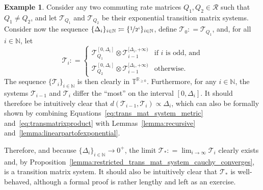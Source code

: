 \documentclass[10pt,a4paper]{paper}
\theoremstyle{definition}
\newtheorem{exmp}{Example}%
\newcommand{\nats}{\mathbb{N}}
\newcommand{\reals}{\mathbb{R}}
\newcommand{\realsnonneg}{\reals_{\geq 0}}
\newcommand{\coloneqq}{:\!=}
\begin{document}
\begin{exmp}\label{exmp:limit_trans_mat_system}
Consider any two commuting rate matrices $Q_1,Q_2\in\mathcal{R}$ such that $Q_1\neq Q_2$, and let $\mathcal{T}_{Q_1}$ and $\mathcal{T}_{Q_2}$ be their exponential transition matrix systems. Consider now the sequence $\{\Delta_i\}_{i\in\nats}\coloneqq \{\nicefrac{1}{2^i}\}_{i\in\nats}$, define $\mathcal{T}_0\coloneqq \mathcal{T}_{Q_1}$, and, for all $i\in\nats$, let
\begin{equation*}
\mathcal{T}_i \coloneqq \begin{cases}
\mathcal{T}_{Q_1}^{[0,\Delta_i]}\otimes \mathcal{T}_{i-1}^{[\Delta_i,+\infty)} & \text{if $i$ is odd, and} \\
\mathcal{T}_{Q_2}^{[0,\Delta_i]}\otimes \mathcal{T}_{i-1}^{[\Delta_i,+\infty)} & \text{otherwise.}
\end{cases}
\end{equation*}
The sequence $\{\mathcal{T}_i\}_{i\in\nats}$ is then clearly in $\mathbb{T}^{\realsnonneg}$. Furthermore, for any $i\in\nats$, the systems $\mathcal{T}_{i-1}$ and $\mathcal{T}_i$ differ the ``most'' on the interval $[0,\Delta_i]$. It should therefore be intuitively clear that $d(\mathcal{T}_{i-1},\mathcal{T}_i)\propto \Delta_i$, which can also be formally shown by combining Equations~\eqref{eq:trans_mat_system_metric} and~\eqref{eq:transmatrixproduct} with Lemmas~\ref{lemma:recursive} and~\ref{lemma:linearpartofexponential}. 

Therefore, and because $\{\Delta_i\}_{i\in\nats}\to0^+$, the limit $\mathcal{T}_*\coloneqq \lim_{i\to\infty}\mathcal{T}_i$ clearly exists and, by Proposition~\ref{lemma:restricted_trans_mat_system_cauchy_converges}, is a transition matrix system. It should also be intuitively clear that $\mathcal{T}_*$ is well-behaved, although a formal proof is rather lengthy and left as an exercise.


\end{exmp}
\end{document}
